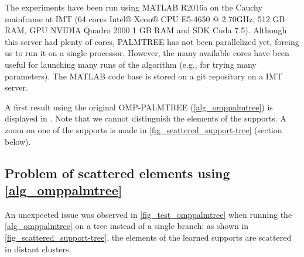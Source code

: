 \noindent The experiments have been run using MATLAB R2016a on the Cauchy mainframe at \ac{IMT} (64 cores Intel® Xeon® CPU E5-4650 @ 2.70GHz, 512 GB RAM, GPU NVIDIA Quadro 2000 1 GB RAM and SDK Cuda 7.5). Although this server had plenty of cores, PALMTREE has not been parallelized yet, forcing us to run it on a single processor. However, the many available cores have been useful for launching many runs of the algorithm (e.g., for trying many parameters). The MATLAB code base is stored on a git repository on a \ac{IMT} server.

\noindent
A first result using the original OMP-PALMTREE (\cref{alg_omppalmtree}) is displayed in . Note that we cannot distinguish the elements of the supports. A zoom on one of the supports is made in \cref{fig_scattered_support-tree} (section below).

\subsection{Problem of scattered elements using \cref{alg_omppalmtree}}
 
An unexpected issue was observed in \cref{fig_test_omppalmtree} when running the \cref{alg_omppalmtree} on a tree instead of a single branch: as shown in \cref{fig_scattered_support-tree}, the elements of the learned supports are scattered in distant clusters. 

